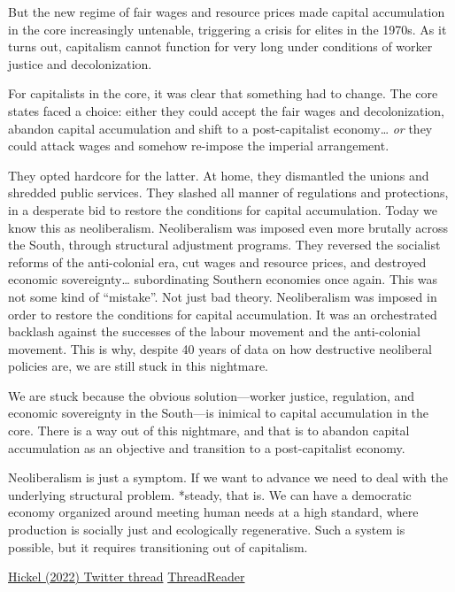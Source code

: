 \documentclass[
]{book}
\begin{document}
But the new regime of fair wages and resource prices made capital accumulation in the core increasingly untenable, triggering a crisis for elites in the 1970s.
As it turns out, capitalism cannot function for very long under conditions of worker justice and decolonization.

For capitalists in the core, it was clear that something had to change.
The core states faced a choice: either they could accept the fair wages and decolonization, abandon capital accumulation and shift to a post-capitalist economy\ldots{} \emph{or} they could attack wages and somehow re-impose the imperial arrangement.

They opted hardcore for the latter.
At home, they dismantled the unions and shredded public services. They slashed all manner of regulations and protections, in a desperate bid to restore the conditions for capital accumulation. Today we know this as neoliberalism.
Neoliberalism was imposed even more brutally across the South, through structural adjustment programs. They reversed the socialist reforms of the anti-colonial era, cut wages and resource prices, and destroyed economic sovereignty\ldots{} subordinating Southern economies once again.
This was not some kind of ``mistake''. Not just bad theory. Neoliberalism was imposed in order to restore the conditions for capital accumulation. It was an orchestrated backlash against the successes of the labour movement and the anti-colonial movement.
This is why, despite 40 years of data on how destructive neoliberal policies are, we are still stuck in this nightmare.

We are stuck because the obvious solution---worker justice, regulation, and economic sovereignty in the South---is inimical to capital accumulation in the core.
There is a way out of this nightmare, and that is to abandon capital accumulation as an objective and transition to a post-capitalist economy.

Neoliberalism is just a symptom. If we want to advance we need to deal with the underlying structural problem.
*steady, that is.
We can have a democratic economy organized around meeting human needs at a high standard, where production is socially just and ecologically regenerative. Such a system is possible, but it requires transitioning out of capitalism.

\href{https://twitter.com/jasonhickel/status/1536656134001643527}{Hickel (2022) Twitter thread}
\href{https://threadreaderapp.com/thread/1536656134001643527.html}{ThreadReader}
\end{document}
